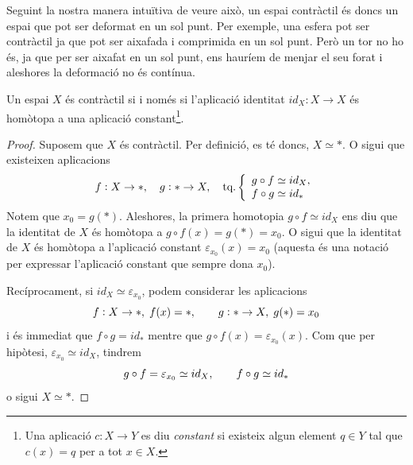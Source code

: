 \documentclass[../main.tex]{subfiles}
\begin{document}
Seguint la nostra manera intuïtiva de veure això, un espai contràctil és doncs un espai que pot ser deformat en un sol punt. Per exemple, una esfera pot ser contràctil ja que pot ser aixafada i comprimida en un sol punt. Però un tor no ho és, ja que per ser aixafat en un sol punt, ens hauríem de menjar el seu forat i aleshores la deformació no és contínua.

\begin{prop}[Exercici 8]\label{exercici1.8}
\label{prop:propietatscontractil} Un espai $X$ és contràctil si i només si l'aplicació identitat $id_X:X\rightarrow X$ és homòtopa a una aplicació constant\footnote{Una aplicació $c:X\rightarrow Y$ es diu \textit{constant} si existeix algun element $q\in Y$ tal que $c(x) = q$ per a tot $x\in X$.}.
\end{prop}
\begin{proof}
Suposem que $X$ és contràctil. Per definició, es té doncs, $X\simeq *$. O sigui que existeixen aplicacions
\begin{equation}
    \notag
    f:X\rightarrow *,\quad g:*\rightarrow X,\quad \text{tq.}\left\{
    \begin{array}{ll}
        g\circ f\simeq id_X,\\
        f\circ g\simeq id_*
    \end{array}
    \right.
\end{equation}
Notem que $x_0 = g(*)$. Aleshores, la primera homotopia $g\circ f\simeq id_X$ ens diu que la identitat de $X$ és homòtopa a $g\circ f (x) = g(*)=x_0$. O sigui que la identitat de $X$ és homòtopa a l'aplicació constant $\varepsilon_{x_0}(x) = x_0$ (aquesta és una notació per expressar l'aplicació constant que sempre dona $x_0$).

Recíprocament, si $id_X\simeq \varepsilon_{x_0}$, podem considerar les aplicacions
\begin{equation}
    \notag
    f:X\rightarrow *,\;f(x) = *,\qquad g:*\rightarrow X,\;g(*)=x_0
\end{equation}
i és immediat que $f\circ g = id_*$ mentre que $g\circ f(x) = \varepsilon_{x_0}(x)$. Com que per hipòtesi, $\varepsilon_{x_0}\simeq id_X$, tindrem
\begin{equation}
    \notag
    g\circ f = \varepsilon_{x_0}\simeq id_X,\qquad f\circ g\simeq id_*
\end{equation}
o sigui $X\simeq *$.
\end{proof}
\end{document}
